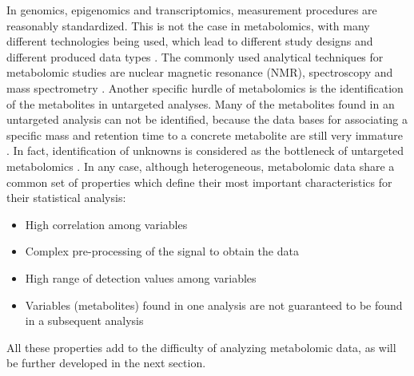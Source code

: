 In genomics, epigenomics and transcriptomics, measurement procedures are reasonably standardized. This is not the case in metabolomics, with many different technologies being used, which lead to different study designs and different produced data types \parencite{moco2007metabolomics}. The commonly used analytical techniques for metabolomic studies are nuclear magnetic resonance (NMR), spectroscopy and mass spectrometry \parencite{buscher2009cross}. Another specific hurdle of metabolomics is the identification of the metabolites in untargeted analyses. Many of the metabolites found in an untargeted analysis can not be identified, because the data bases for associating a specific mass and retention time to a concrete metabolite are still very immature \parencite{mathew2013metabolomics}. In fact, identification of unknowns is considered as the bottleneck of untargeted metabolomics \parencite{bingol2018recent}.
In any case, although heterogeneous, metabolomic data share a common set of properties which define their most important characteristics for their statistical analysis:

\begin{itemize}
    \item High correlation among variables
    \item Complex pre-processing of the signal to obtain the data
    \item High range of detection values among variables
    \item Variables (metabolites) found in one analysis are not guaranteed to be found in a subsequent analysis
\end{itemize}

All these properties add to the difficulty of analyzing metabolomic data, as will be further developed in the next section.

